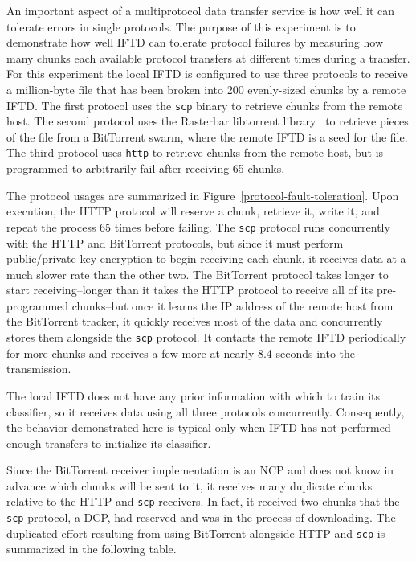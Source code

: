 An important aspect of a multiprotocol data transfer service is how well it can tolerate errors in single protocols.  The purpose of this experiment is to demonstrate how well IFTD can tolerate protocol failures by measuring how many chunks each available protocol transfers at different times during a transfer.  For this experiment the local IFTD is configured to use three protocols to receive a million-byte file that has been broken into 200 evenly-sized chunks by a remote IFTD.  The first protocol uses the \texttt{scp} binary to retrieve chunks from the remote host.  The second protocol uses the Rasterbar libtorrent library~\cite{libtorrent} to retrieve pieces of the file from a BitTorrent swarm, where the remote IFTD is a seed for the file.  The third protocol uses \texttt{http} to retrieve chunks from the remote host, but is programmed to arbitrarily fail after receiving 65 chunks.

The protocol usages are summarized in Figure~\ref{protocol-fault-toleration}.  Upon execution, the HTTP protocol will reserve a chunk, retrieve it, write it, and repeat the process 65 times before failing.  The \texttt{scp} protocol runs concurrently with the HTTP and BitTorrent protocols, but since it must perform public/private key encryption to begin receiving each chunk, it receives data at a much slower rate than the other two.  The BitTorrent protocol takes longer to start receiving--longer than it takes the HTTP protocol to receive all of its pre-programmed chunks--but once it learns the IP address of the remote host from the BitTorrent tracker, it quickly receives most of the data and concurrently stores them alongside the \texttt{scp} protocol.  It contacts the remote IFTD periodically for more chunks and receives a few more at nearly 8.4 seconds into the transmission.

The local IFTD does not have any prior information with which to train its classifier, so it receives data using all three protocols concurrently.  Consequently, the behavior demonstrated here is typical only when IFTD has not performed enough transfers to initialize its classifier.

Since the BitTorrent receiver implementation is an NCP and does not know in advance which chunks will be sent to it, it receives many duplicate chunks relative to the HTTP and \texttt{scp} receivers.  In fact, it received two chunks that the \texttt{scp} protocol, a DCP, had reserved and was in the process of downloading.  The duplicated effort resulting from using BitTorrent alongside HTTP and \texttt{scp} is summarized in the following table.


